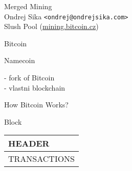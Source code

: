 \documentclass{beamer}
\begin{document}
\Large
\begin{frame}

    {\Huge Merged Mining}\\
    \vspace{7mm}
    {\LARGE Ondrej Sika \lstinline|<ondrej@ondrejsika.com>|}\\
    \vspace{7mm}
    {\Large Slush Pool (\url{mining.bitcoin.cz})}\\

\end{frame}

\begin{frame}

    {\Huge Bitcoin}\\

\end{frame}

\begin{frame}

    {\Huge Namecoin}\\

    \vspace{5mm}

    - fork of Bitcoin\\
    - vlastni blockchain\\

\end{frame}

\begin{frame}

    {\Huge How Bitcoin Works?}\\

\end{frame}

\begin{frame}

    {\Huge Block}\\

    \vspace{5mm}

    \begin{tabular}{|l|}
    \hline
    HEADER \\
    \hline
    TRANSACTIONS \\
    \hline
    \end{tabular}

\end{frame}
\end{document}
